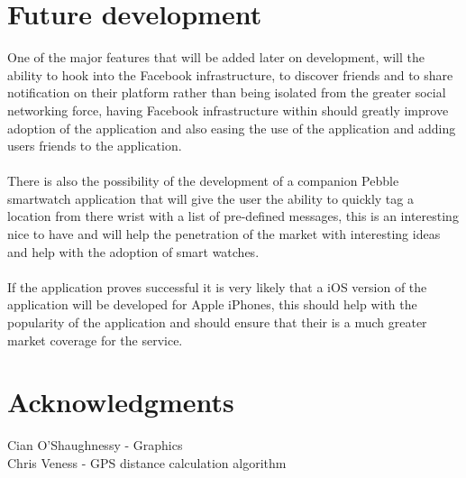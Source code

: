 \documentclass[a0,landscape]{a0poster}
\begin{document}
\begin{multicols}{5}
\color{RosyBrown}
\section{Future development}

One of the major features that will be added later on development, will the ability to hook into the Facebook infrastructure, to discover friends and to share notification on their platform rather than being isolated from the greater social networking force, having Facebook infrastructure within should greatly improve adoption of the application and also easing the use of the application and adding users friends to the application.\\
\\
There is also the possibility of the development of a companion Pebble smartwatch application that will give the user the ability to quickly tag a location from there wrist with a list of pre-defined messages, this is an interesting nice to have and will help the penetration of the market with interesting ideas and help with the adoption of smart watches.\\
\\
If the application proves successful it is very likely that a iOS version of the application will be developed for Apple iPhones, this should help with the popularity of the application and should ensure that their is a much greater market coverage for the service.

\color{DeepSkyBlue}
\section{Acknowledgments}

Cian O'Shaughnessy - Graphics\\
Chris Veness - GPS distance calculation algorithm\\


\end{multicols}
\end{document}
